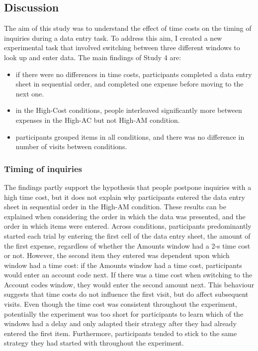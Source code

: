 \subsection{Discussion}
The aim of this study was to understand the effect of time costs on the timing of inquiries during a data entry task. To address this aim, I created a new experimental task that involved switching between three different windows to look up and enter data. The main findings of Study 4 are:

\begin{itemize}
\item
if there were no differences in time costs, participants completed a data entry sheet in sequential order, and completed one expense before moving to the next one. 
\item
in the High-Cost conditions, people interleaved significantly more between expenses in the High-AC but not High-AM condition. 
\item
participants grouped items in all conditions, and there was no difference in number of visits between conditions.
\end{itemize}

\subsubsection{Timing of inquiries}
The findings partly support the hypothesis that people postpone inquiries with a high time cost, but it does not explain why participants entered the data entry sheet in sequential order in the High-AM condition. 
These results can be explained when considering the order in which the data was presented, and the order in which items were entered. Across conditions, participants predominantly started each trial by entering the first cell of the data entry sheet, the amount of the first expense, regardless of whether the Amounts window had a 2-s time cost or not. However, the second item they entered was dependent upon which window had a time cost: if the Amounts window had a time cost, participants would enter an account code next. If there was a time cost when switching to the Account codes window, they would enter the second amount next.
This behaviour suggests that time costs do not influence the first visit, but do affect subsequent visits. Even though the time cost was consistent throughout the experiment, potentially the experiment was too short for participants to learn which of the windows had a delay and only adapted their strategy after they had already entered the first item. Furthermore, participants tended to stick to the same strategy they had started with throughout the experiment.

